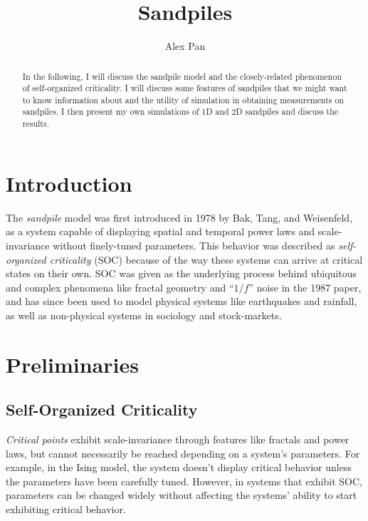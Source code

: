 \documentclass{article}
\title{\vspace{-2cm}Sandpiles} %
\author{Alex Pan}
\date{} %
\begin{document}
\maketitle

\begin{abstract}
In the following, I will discuss the sandpile model and the closely-related phenomenon of self-organized criticality. I will discuss some features of sandpiles that we might want to know information about and the utility of simulation in obtaining measurements on sandpiles. I then present my own simulations of 1D and 2D sandpiles and discuss the results.
\end{abstract}

\section{Introduction}
The \textit{sandpile} model was first introduced in 1978 by Bak, Tang, and Weisenfeld, as a system capable of displaying spatial and temporal power laws and scale-invariance without finely-tuned parameters. This behavior was described as \textit{self-organized criticality} (SOC) because of the way these systems can arrive at critical states on their own. SOC was given as the underlying process behind ubiquitous and complex phenomena like fractal geometry and ``$1/f$'' noise in the 1987 paper, and has since been used to model physical systems like earthquakes and rainfall, as well as non-physical systems in sociology and stock-markets.

\section{Preliminaries}
\subsection{Self-Organized Criticality}
\textit{Critical points} exhibit scale-invariance through features like fractals and power laws, but cannot necessarily be reached depending on a system's parameters. For example, in the Ising model, the system doesn't display critical behavior unless the parameters have been carefully tuned. However, in systems that exhibit SOC, parameters can be changed widely without affecting the systems' ability to start exhibiting critical behavior.
\end{document}
